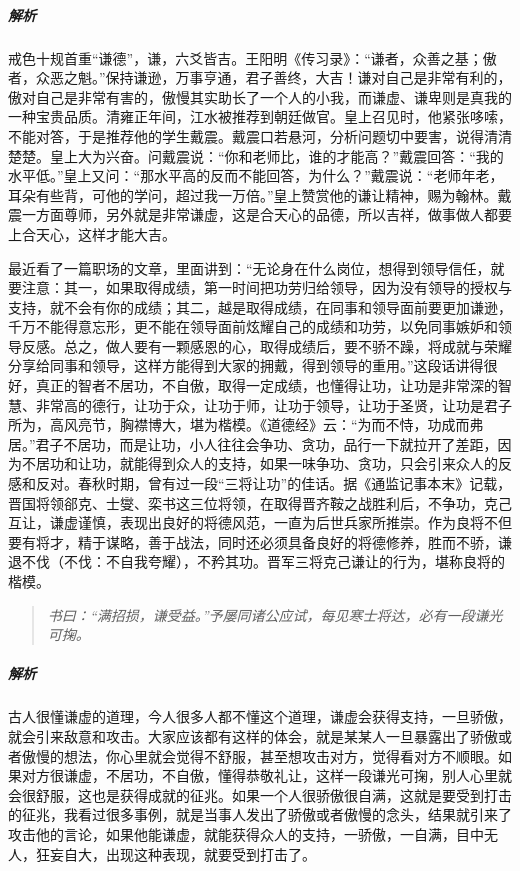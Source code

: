 \subparagraph{解析} 戒色十规首重“谦德”，谦，六爻皆吉。王阳明《传习录》：“谦者，众善之基；傲者，众恶之魁。”保持谦逊，万事亨通，君子善终，大吉！谦对自己是非常有利的，傲对自己是非常有害的，傲慢其实助长了一个人的小我，而谦虚、谦卑则是真我的一种宝贵品质。清雍正年间，江水被推荐到朝廷做官。皇上召见时，他紧张哆嗦，不能对答，于是推荐他的学生戴震。戴震口若悬河，分析问题切中要害，说得清清楚楚。皇上大为兴奋。问戴震说：“你和老师比，谁的才能高？”戴震回答：“我的水平低。”皇上又问：“那水平高的反而不能回答，为什么？”戴震说：“老师年老，耳朵有些背，可他的学问，超过我一万倍。”皇上赞赏他的谦让精神，赐为翰林。戴震一方面尊师，另外就是非常谦虚，这是合天心的品德，所以吉祥，做事做人都要上合天心，这样才能大吉。

最近看了一篇职场的文章，里面讲到：“无论身在什么岗位，想得到领导信任，就要注意：其一，如果取得成绩，第一时间把功劳归给领导，因为没有领导的授权与支持，就不会有你的成绩；其二，越是取得成绩，在同事和领导面前要更加谦逊，千万不能得意忘形，更不能在领导面前炫耀自己的成绩和功劳，以免同事嫉妒和领导反感。总之，做人要有一颗感恩的心，取得成绩后，要不骄不躁，将成就与荣耀分享给同事和领导，这样方能得到大家的拥戴，得到领导的重用。”这段话讲得很好，真正的智者不居功，不自傲，取得一定成绩，也懂得让功，让功是非常深的智慧、非常高的德行，让功于众，让功于师，让功于领导，让功于圣贤，让功是君子所为，高风亮节，胸襟博大，堪为楷模。《道德经》云：“为而不恃，功成而弗居。”君子不居功，而是让功，小人往往会争功、贪功，品行一下就拉开了差距，因为不居功和让功，就能得到众人的支持，如果一味争功、贪功，只会引来众人的反感和反对。春秋时期，曾有过一段“三将让功”的佳话。据《通监记事本末》记载，晋国将领郤克、士燮、栾书这三位将领，在取得晋齐鞍之战胜利后，不争功，克己互让，谦虚谨慎，表现出良好的将德风范，一直为后世兵家所推崇。作为良将不但要有将才，精于谋略，善于战法，同时还必须具备良好的将德修养，胜而不骄，谦退不伐（不伐：不自我夸耀），不矜其功。晋军三将克己谦让的行为，堪称良将的楷模。

\begin{quote}\it
    书曰：“满招损，谦受益。”予屡同诸公应试，每见寒士将达，必有一段谦光可掬。
\end{quote}

\subparagraph{解析} 古人很懂谦虚的道理，今人很多人都不懂这个道理，谦虚会获得支持，一旦骄傲，就会引来敌意和攻击。大家应该都有这样的体会，就是某某人一旦暴露出了骄傲或者傲慢的想法，你心里就会觉得不舒服，甚至想攻击对方，觉得看对方不顺眼。如果对方很谦虚，不居功，不自傲，懂得恭敬礼让，这样一段谦光可掬，别人心里就会很舒服，这也是获得成就的征兆。如果一个人很骄傲很自满，这就是要受到打击的征兆，我看过很多事例，就是当事人发出了骄傲或者傲慢的念头，结果就引来了攻击他的言论，如果他能谦虚，就能获得众人的支持，一骄傲，一自满，目中无人，狂妄自大，出现这种表现，就要受到打击了。

